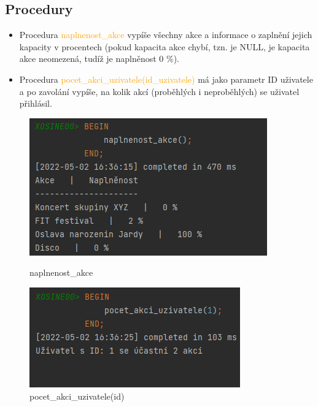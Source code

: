 \documentclass[11pt,a4paper]{article}
\begin{document}
    \subsection{Procedury}
        \begin{itemize}
            \item Procedura \textcolor{orange}{naplnenost\_akce} vypíše všechny akce a informace o zaplnění jejich kapacity v procentech (pokud kapacita akce chybí, tzn. je NULL, je kapacita akce neomezená, tudíž je naplněnost 0 \%).
            \item Procedura \textcolor{orange}{pocet\_akci\_uzivatele(id\_uzivatele)} má jako parametr ID uživatele a po zavolání vypíše, na kolik akcí (proběhlých i neproběhlých) se uživatel přihlásil.
        \end{itemize}
        \begin{figure}[H]
          \centering
          \begin{minipage}[b]{0.49\textwidth}
            \includegraphics[width=\textwidth]{naplnenost}
            \caption{naplnenost\_akce}
          \end{minipage}
          \hfill
          \begin{minipage}[b]{0.5\textwidth}
            \includegraphics[width=\textwidth]{pocet_akci}
            \caption{pocet\_akci\_uzivatele(id)}
          \end{minipage}
        \end{figure}
\end{document}
